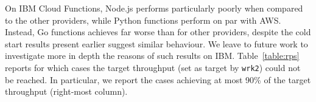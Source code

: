 On \gls{IBM} Cloud Functions, Node.js performs particularly poorly when compared to the other providers, while Python functions perform on par with \gls{AWS}.
Instead, Go functions achieves far worse than for other providers, despite the cold start results present earlier suggest similar behaviour. 
We leave to future work to investigate more in depth the reasons of such results on \gls{IBM}.
Table~\ref{table:rps} reports for which cases the target throughput (set as target by \texttt{wrk2}) could not be reached. 
In particular, we report the cases achieving at most 90\% of the target throughput (right-most column).

